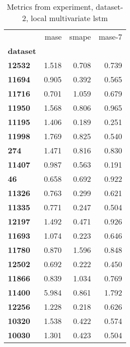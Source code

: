 \begin{table}[h]
\centering
\caption{Metrics from experiment, dataset-2, local multivariate lstm}
\label{table:local-multivariate-lstm-dataset-2}
\begin{tabular}{lrrr}
\toprule
{} &   mase &  smape &  mase-7 \\
\textbf{dataset} &        &        &         \\
\midrule
\textbf{12532  } &  1.518 &  0.708 &   0.739 \\
\textbf{11694  } &  0.905 &  0.392 &   0.565 \\
\textbf{11716  } &  0.701 &  1.059 &   0.679 \\
\textbf{11950  } &  1.568 &  0.806 &   0.965 \\
\textbf{11195  } &  1.406 &  0.189 &   0.251 \\
\textbf{11998  } &  1.769 &  0.825 &   0.540 \\
\textbf{274    } &  1.471 &  0.816 &   0.830 \\
\textbf{11407  } &  0.987 &  0.563 &   0.191 \\
\textbf{46     } &  0.658 &  0.692 &   0.922 \\
\textbf{11326  } &  0.763 &  0.299 &   0.621 \\
\textbf{11335  } &  0.771 &  0.247 &   0.504 \\
\textbf{12197  } &  1.492 &  0.471 &   0.926 \\
\textbf{11693  } &  1.074 &  0.223 &   0.646 \\
\textbf{11780  } &  0.870 &  1.596 &   0.848 \\
\textbf{12502  } &  0.692 &  0.222 &   0.450 \\
\textbf{11866  } &  0.839 &  1.034 &   0.769 \\
\textbf{11400  } &  5.984 &  0.861 &   1.792 \\
\textbf{12256  } &  1.228 &  0.218 &   0.626 \\
\textbf{10320  } &  1.538 &  0.422 &   0.574 \\
\textbf{10030  } &  1.301 &  0.423 &   0.504 \\
\bottomrule
\end{tabular}
\end{table}
